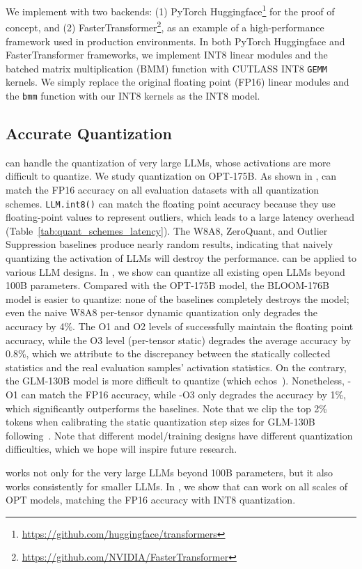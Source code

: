 We implement \method with two backends: (1) PyTorch Huggingface\footnote{\url{https://github.com/huggingface/transformers}} for the proof of concept, and (2) FasterTransformer\footnote{\url{https://github.com/NVIDIA/FasterTransformer}}, as an example of a high-performance framework used in production environments. In both PyTorch Huggingface and FasterTransformer frameworks, we implement INT8 linear modules and the batched matrix multiplication (BMM) function with CUTLASS INT8 \texttt{GEMM} kernels. We simply replace the original floating point (FP16) linear modules and the \texttt{bmm} function with our INT8 kernels as the INT8 model.

\subsection{Accurate Quantization}
\label{sec:accurate-quantization}
\method can handle the quantization of very large LLMs, whose activations are more difficult to quantize.
We study quantization on OPT-175B.
As shown in , \method can match the FP16 accuracy on all evaluation datasets with all quantization schemes. \texttt{LLM.int8()} can match the floating point accuracy because they use floating-point values to represent outliers, which leads to a large latency overhead (Table~\ref{tab:quant_schemes_latency}). The W8A8, ZeroQuant, and Outlier Suppression baselines produce nearly random results, indicating that naively quantizing the activation of LLMs will destroy the performance.
\method can be applied to various LLM designs.
In , we show \method can quantize all existing open LLMs beyond 100B parameters.
Compared with the OPT-175B model, the BLOOM-176B model is easier to quantize: none of the baselines completely destroys the model; even the naive W8A8 per-tensor dynamic quantization only degrades the accuracy by 4\%. The O1 and O2 levels of \method successfully maintain the floating point accuracy, while the O3 level (per-tensor static) degrades the average accuracy by 0.8\%, which we attribute to the discrepancy between the statically collected statistics and the real evaluation samples' activation statistics.
On the contrary, the GLM-130B model is more difficult to quantize (which echos~\citeauthor{zeng2022glm}). Nonetheless, \method-O1 can match the FP16 accuracy, while \method-O3 only degrades the accuracy by 1\%, which significantly outperforms the baselines. Note that we clip the top 2\% tokens when calibrating the static quantization step sizes for GLM-130B following~\citet{outlier_suppression}.
Note that different model/training designs have different quantization difficulties, which we hope will inspire future research.

 \method works not only for the very large LLMs beyond 100B parameters, but it also works consistently for smaller LLMs.
In , we show that \method can work on all scales of OPT models, matching the FP16 accuracy with INT8 quantization.

